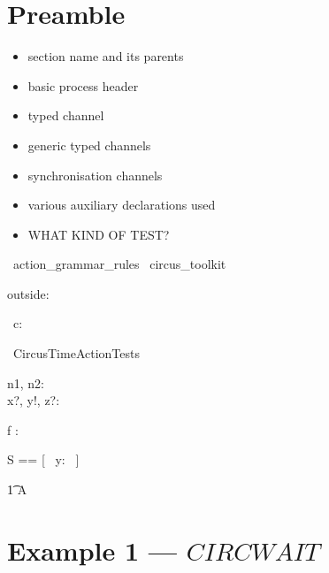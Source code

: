 \documentclass{article}
\begin{document}
\section{Preamble}

\begin{itemize}
   \item section name and its parents
   \item basic process header
   \item typed channel
   \item generic typed channels
   \item synchronisation channels
   \item various auxiliary declarations used
   \item WHAT KIND OF TEST?
\end{itemize}

\begin{zsection}
  \SECTION\ action\_grammar\_rules \parents\ circus\_toolkit
\end{zsection}

\begin{axdef}
    outside: \nat
\end{axdef}

\begin{circus}
   \circchannel\ c: \nat \cross \nat \cross \nat \cross \nat
\end{circus}

\begin{circus}
   \circprocess\ CircusTimeActionTests \circdef \circbegin
\end{circus}

\begin{axdef}
   n1, n2: \nat \\
   x?, y!, z?: \nat
\end{axdef}

\begin{axdef}
   f : \nat \fun \nat \cross \nat
\end{axdef}

\begin{zed}
   S == [~ y: \nat ~]
\end{zed}

\begin{circusaction}
	\t1 A \circdef \Skip
\end{circusaction}

\newpage
\section{Example 1 --- $CIRCWAIT$}
\end{document}
